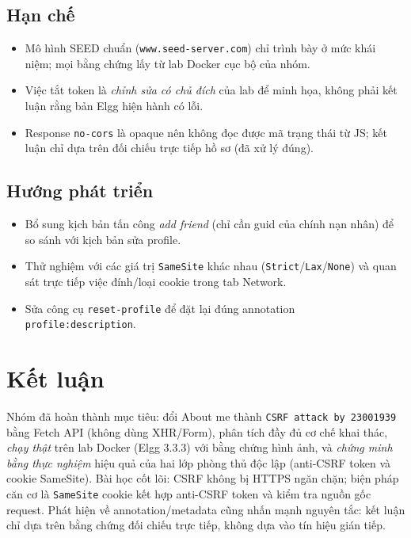 \documentclass[11pt,a4paper]{article}
\begin{document}
\subsection{Hạn chế}
\begin{itemize}
  \item Mô hình SEED chuẩn (\texttt{www.seed-server.com}) chỉ trình bày ở mức khái niệm; mọi bằng chứng lấy từ lab Docker cục bộ của nhóm.
  \item Việc tắt token là \emph{chỉnh sửa có chủ đích} của lab để minh họa, không phải kết luận rằng bản Elgg hiện hành có lỗi.
  \item Response \texttt{no-cors} là opaque nên không đọc được mã trạng thái từ JS; kết luận chỉ dựa trên đối chiếu trực tiếp hồ sơ (đã xử lý đúng).
\end{itemize}
\subsection{Hướng phát triển}
\begin{itemize}
  \item Bổ sung kịch bản tấn công \emph{add friend} (chỉ cần guid của chính nạn nhân) để so sánh với kịch bản sửa profile.
  \item Thử nghiệm với các giá trị \texttt{SameSite} khác nhau (\texttt{Strict}/\texttt{Lax}/\texttt{None}) và quan sát trực tiếp việc đính/loại cookie trong tab Network.
  \item Sửa công cụ \texttt{reset-profile} để đặt lại đúng annotation \texttt{profile:description}.
\end{itemize}

\section{Kết luận}
Nhóm đã hoàn thành mục tiêu: đổi About me thành \texttt{CSRF attack by 23001939} bằng Fetch API (không dùng XHR/Form), phân tích đầy đủ cơ chế khai thác, \emph{chạy thật} trên lab Docker (Elgg 3.3.3) với bằng chứng hình ảnh, và \emph{chứng minh bằng thực nghiệm} hiệu quả của hai lớp phòng thủ độc lập (anti-CSRF token và cookie SameSite). Bài học cốt lõi: CSRF không bị HTTPS ngăn chặn; biện pháp căn cơ là \texttt{SameSite} cookie kết hợp anti-CSRF token và kiểm tra nguồn gốc request. Phát hiện về annotation/metadata cũng nhấn mạnh nguyên tắc: kết luận chỉ dựa trên bằng chứng đối chiếu trực tiếp, không dựa vào tín hiệu gián tiếp.
\end{document}
